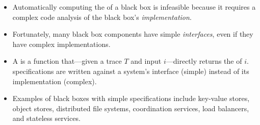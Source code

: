 \begin{itemize}
  \item
    Automatically computing the \watprovenance{} of a black box is infeasible
    because it requires a complex code analysis of the black box's
    \emph{implementation}.
  \item
    Fortunately, many black box components have simple \emph{interfaces}, even
    if they have complex implementations.
  \item
    A  is a function that---given a
    trace $T$ and input $i$---directly returns the \watprovenance{} of $i$.
    \Watprovenance{} specifications are written against a system's interface
    (simple) instead of its implementation (complex).
  \item
    Examples of black boxes with simple \watprovenance{} specifications include
    key-value stores, object stores, distributed file systems, coordination
    services, load balancers, and stateless services.
\end{itemize}
